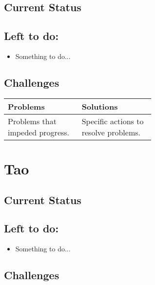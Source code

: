 \documentclass[compsoc,draftclsnofoot,onecolumn,10pt]{IEEEtran}
\begin{document}
	\subsection{Current Status}
		
	\subsection{Left to do:}
		\begin{itemize}
			\item Something to do...
		\end{itemize}
	\subsection{Challenges}
		
		\begin{tabular}{|p{0.3\linewidth}|p{0.3\linewidth}|}
			\hline
			\textbf{Problems} & \textbf{Solutions}\\
			\hline
			Problems that impeded progress. & Specific actions to resolve problems.\\
			\hline
						
		\end{tabular}
		
\section{Tao}
\subsection{Current Status}

\subsection{Left to do:}
\begin{itemize}
	\item Something to do...
\end{itemize}
\subsection{Challenges}
\end{document}
